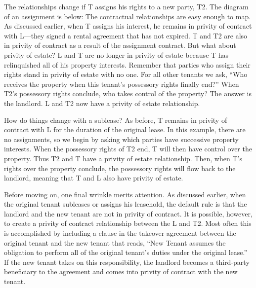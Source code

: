 The relationships change if T assigns his rights to a new party, T2.  The
diagram of an assignment is below:
The contractual relationships are easy enough to map.  As discussed earlier,
when T assigns his interest, he remains in privity of contract with L---they
signed a rental agreement that has not expired.  T and T2 are also in privity
of contract as a result of the assignment contract.  But what about privity of
estate?  L and T are no longer in privity of estate because T has relinquished
all of his property interests.  Remember that parties who assign their rights
stand in privity of estate with no one.  For all other tenants we ask, ``Who
receives the property when this tenant's possessory rights finally end?'' When
T2's possessory rights conclude, who takes control of the property? The answer
is the landlord.  L and T2 now have a privity of estate relationship.  

How do things change with a sublease?
As before, T remains in privity of contract with L for the duration of the
original lease.  In this example, there are no assignments, so we begin by
asking which parties have successive property interests.  When the possessory
rights of T2 end, T will then have control over the property.  Thus T2 and T
have a privity of estate relationship.  Then, when T's rights over the property
conclude, the possessory rights will flow back to the landlord, meaning that T
and L also have privity of estate.  

Before moving on, one final wrinkle merits attention.  As discussed earlier,
when the original tenant subleases or assigns his leasehold, the default rule
is that the landlord and the new tenant are not in privity of contract.  It is
possible, however, to create a privity of contract relationship between the L
and T2.  Most often this is accomplished by including a clause in the takeover
agreement between the original tenant and the new tenant that reads, ``New
Tenant assumes the obligation to perform all of the original tenant's duties
under the original lease.''  If the new tenant takes on this responsibility,
the landlord becomes a third-party beneficiary to the agreement and comes into
privity of contract with the new tenant.  

